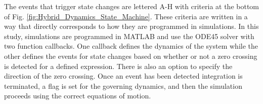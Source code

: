 The events that trigger state changes are lettered A-H with criteria at the bottom of Fig. \ref{fig:Hybrid_Dynamics_State_Machine}. These criteria are written in a way that directly corresponds to how they are programmed in simulations. In this study, simulations are programmed in MATLAB and use the ODE45 solver with two function callbacks. One callback defines the dynamics of the system while the other defines the events for state changes based on whether or not a zero crossing is detected for a defined expression. There is also an option to specify the direction of the zero crossing. Once an event has been detected integration is terminated, a flag is set for the governing dynamics, and then the simulation proceeds using the correct equations of motion.

